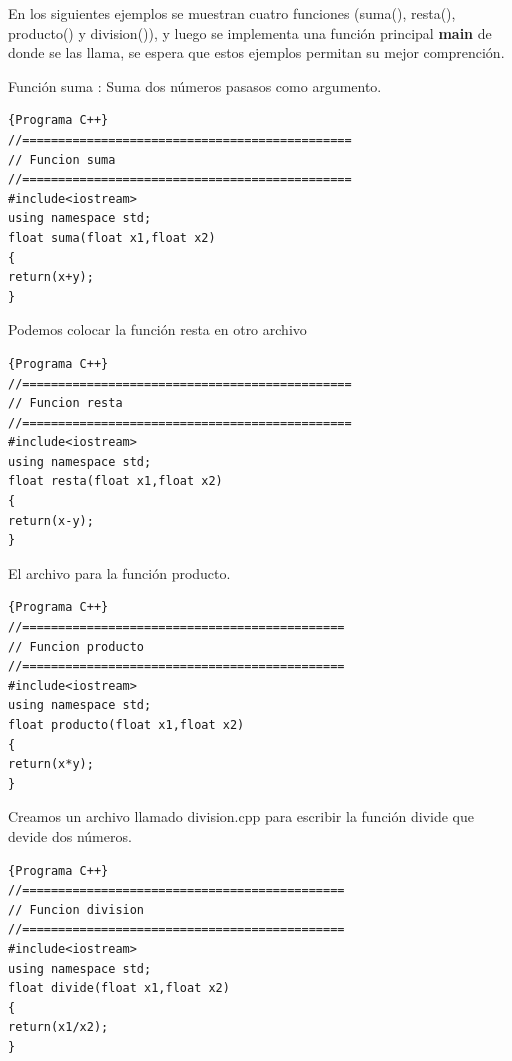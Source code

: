\documentclass[a4paper,12pt,spanish]{article}
\newcommand\mylstcaption{}
\begin{document}
En los siguientes ejemplos se muestran cuatro funciones (suma(), resta(), producto() y division()), y luego se implementa una función principal \textbf{main} de donde se las llama, se espera que estos ejemplos permitan su mejor comprención.\\

\newpage

Función suma : Suma dos números pasasos como argumento.

\renewcommand\mylstcaption{\textbf{suma.cpp}: función suma}

\begin{lstlisting}[frame=trBL,firstnumber=1,caption=\mylstcaption]{Programa C++}
//==============================================
// Funcion suma
//==============================================
#include<iostream>
using namespace std;
float suma(float x1,float x2)
{
return(x+y);
}
\end{lstlisting}

Podemos colocar la función resta en otro archivo

\begin{lstlisting}[frame=trBL,firstnumber=1,caption={\textbf{resta.cpp}: funcion resta}]{Programa C++}
//==============================================
// Funcion resta
//==============================================
#include<iostream>
using namespace std;
float resta(float x1,float x2)
{
return(x-y);
}
\end{lstlisting}

\newpage
El archivo para la función producto.\\

    \begin{lstlisting}[frame=trBL,firstnumber=0,caption={\textbf{producto.cpp}: función producto}]{Programa C++}
//=============================================
// Funcion producto
//=============================================
#include<iostream>
using namespace std;
float producto(float x1,float x2)
{
return(x*y);
}
\end{lstlisting}
\newpage
Creamos un archivo llamado division.cpp para escribir la función divide que devide dos números.\\
    \begin{lstlisting}[frame=trBL,firstnumber=0,caption={\textbf{division.cpp}: Operaciones Básicas}]{Programa C++}
//=============================================
// Funcion division
//=============================================
#include<iostream>
using namespace std;
float divide(float x1,float x2)
{
return(x1/x2);
}
\end{lstlisting}
\end{document}
